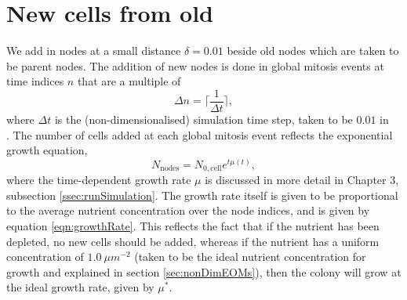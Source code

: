 \section{New cells from old}
We add in nodes at a small distance $\delta = 0.01$ beside old nodes 
which are taken to be parent nodes. The addition of new nodes is done in global mitosis events 
at time indices $n$ that are a multiple of
\begin{equation*}
    \Delta n = \bigg\lceil \frac{1}{\Delta t} \bigg\rceil,
\end{equation*}
where $\Delta t$ is the (non-dimensionalised) simulation time step, taken to be $0.01$ in \\
 .
The number of cells added at each global mitosis event reflects the exponential growth equation,
\begin{equation*}
    N_{\textrm{nodes}} = N_{0, \textrm{cell}} e^{t \mu(t)},
\end{equation*}
where the time-dependent growth rate $\mu$ is discussed 
in more detail in Chapter 3, subsection \ref{ssec:runSimulation}. The growth rate 
itself is given to be proportional to the average nutrient concentration over the node indices, and 
is given by equation \ref{eqn:growthRate}. This reflects the fact that if the nutrient has been depleted,
no new cells should be added, whereas if the nutrient has a uniform concentration of $1.0 \ \mu m^{-2}$ 
(taken to be the ideal nutrient concentration for growth and explained in section \ref{sec:nonDimEOMs}), 
then the colony will grow at the ideal growth rate, given by $\mu^*$.
\\

